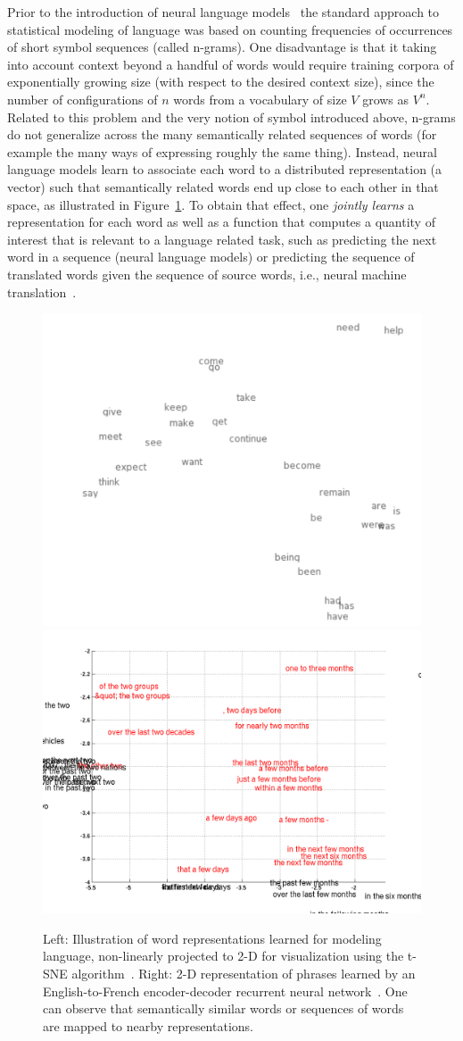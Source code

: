 \documentclass[]{article}
\begin{document}
Prior to the introduction of neural language
models~\citet{BenDucVin01-short} the standard approach to statistical
modeling of language was based on counting frequencies of occurrences of
short symbol sequences (called n-grams). One disadvantage is that it
taking into account context beyond a handful of words would require
training corpora of exponentially growing size (with respect to the
desired context size), since the number of configurations of $n$
words from a vocabulary of size $V$ grows as $V^n$. Related to this
problem and the very notion of symbol introduced above, n-grams
do not generalize across the many semantically related sequences 
of words (for example the many ways of expressing roughly the same thing).
Instead, neural language models learn to associate each word to a
distributed representation (a vector) such that semantically related
words end up close to each other in that space, as illustrated in
Figure~\ref{fig:word-embeddings}. To obtain that effect, one
{\em jointly learns} a representation for each word as well as
a function that computes a quantity of interest that is relevant
to a language related task, such as predicting the next word
in a sequence (neural language models) or predicting the sequence
of translated words given the sequence of source words, i.e., neural
machine translation~\citep{Bahdanau-et-al-arxiv2014,Sutskever-et-al-NIPS2014}.


\begin{figure}[H]
\centerline{
\includegraphics[width=0.49\linewidth]{word-embeddings.png}
\includegraphics[width=0.49\linewidth]{phrase_zoom2.png}
}
\caption{Left: Illustration of word representations learned for modeling
language, non-linearly projected to 2-D for visualization using the
t-SNE algorithm~\citep{VanDerMaaten08}. Right: 2-D representation
of phrases learned by an English-to-French encoder-decoder recurrent
neural network~\citep{Cho-et-al-EMNLP2014}. One can observe that
semantically similar words or sequences of words are  mapped to
nearby representations.
}
\label{fig:word-embeddings}
\end{figure}
\end{document}
